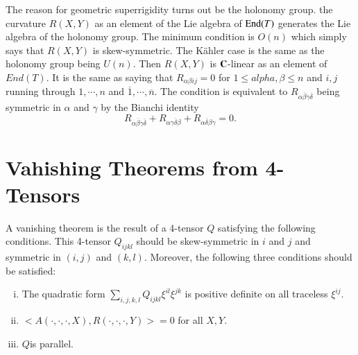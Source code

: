 The reason for geometric superrigidity turns out be the holonomy group. the curvature $R(X, Y)$ as an element of the Lie algebra of $\operatorname{End}(T)$ generates the Lie algebra of the holonomy group. The minimum condition is $O(n)$ which simply says that $R(X, Y)$ is skew-symmetric. The K\"ahler case is the same as the holonomy group being $U(n)$. Then $R(X, Y)$ is $\mathbf{C}$-linear as an element of $End(T)$. It is the same as saying that $R_{\alpha \beta ij}=0$ for $1 \leq alpha, \beta \leq n$ and $i ,j$ running through $1, \cdots, n$ and $\overline{1}, \cdots, \overline{n}$. The condition is equivalent to $R_{\alpha \overline{\beta}\gamma\overline{\delta}}$ being symmetric in $\alpha$ and $\gamma$ by the Bianchi identity
$$
R_{\alpha  \overline{\beta} \gamma \overline{\delta}} + R_{\alpha \gamma \overline{\delta}\beta} + R_{\alpha \overline{\delta}\beta \gamma} = 0.
$$

\section*{Vahishing Theorems from 4-Tensors}

A vanishing theorem is the result of a 4-tensor $Q$ satisfying the following conditions. This 4-tensor $Q_{ijkl}$ should be skew-symmetric in $i$ and $j$ and symmetric in $(i,j)$ and $(k, l)$. Moreover, the following three conditions should be satisfied:
\begin{enumerate}[(i)]
\item The quadratic form $\sum_{i,j,k,l} Q_{ijkl}\xi^{il} \xi^{jk}$ is positive definite on all traceless $\xi^{ij}$.\label{art16-enum-i}

\item $< A(\cdot,\cdot,\cdot, X), R(\cdot,\cdot,\cdot, Y) > = 0$ for all $X, Y$.\label{art16-enum-ii}

\item $Q$\pageoriginale is parallel.\label{art16-enum-iii}
\end{enumerate}

